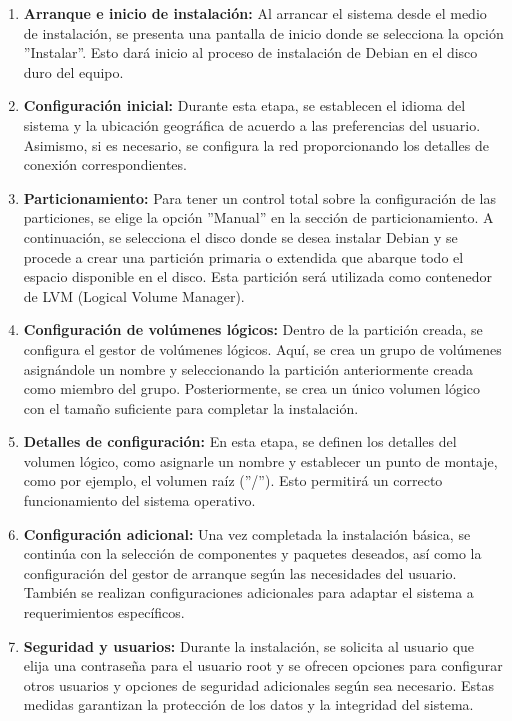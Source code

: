 		\begin{enumerate}
	
			\item\textbf{Arranque e inicio de instalación:} Al arrancar el sistema desde el medio de instalación, se presenta una pantalla de inicio donde se selecciona la opción ''Instalar''. Esto dará inicio al proceso de instalación de Debian en el disco duro del equipo.

			\item\textbf{Configuración inicial:} Durante esta etapa, se establecen el idioma del sistema y la ubicación geográfica de acuerdo a las preferencias del usuario. Asimismo, si es necesario, se configura la red proporcionando los detalles de conexión correspondientes.

			\item\textbf{Particionamiento:} Para tener un control total sobre la configuración de las particiones, se elige la opción ''Manual'' en la sección de particionamiento. A continuación, se selecciona el disco donde se desea instalar Debian y se procede a crear una partición primaria o extendida que abarque todo el espacio disponible en el disco. Esta partición será utilizada como contenedor de LVM (Logical Volume Manager).

			\item\textbf{Configuración de volúmenes lógicos:} Dentro de la partición creada, se configura el gestor de volúmenes lógicos. Aquí, se crea un grupo de volúmenes asignándole un nombre y seleccionando la partición anteriormente creada como miembro del grupo. Posteriormente, se crea un único volumen lógico con el tamaño suficiente para completar la instalación.

			\item\textbf{Detalles de configuración:} En esta etapa, se definen los detalles del volumen lógico, como asignarle un nombre y establecer un punto de montaje, como por ejemplo, el volumen raíz (''/''). Esto permitirá un correcto funcionamiento del sistema operativo.

			\item\textbf{Configuración adicional:} Una vez completada la instalación básica, se continúa con la selección de componentes y paquetes deseados, así como la configuración del gestor de arranque según las necesidades del usuario. También se realizan configuraciones adicionales para adaptar el sistema a requerimientos específicos.

			\item\textbf{Seguridad y usuarios:} Durante la instalación, se solicita al usuario que elija una contraseña para el usuario root y se ofrecen opciones para configurar otros usuarios y opciones de seguridad adicionales según sea necesario. Estas medidas garantizan la protección de los datos y la integridad del sistema.
		
		\end{enumerate}


